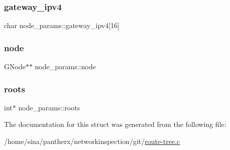 \subsubsection{\texorpdfstring{gateway\+\_\+ipv4}{gateway\_ipv4}}
{\footnotesize\ttfamily char node\+\_\+params\+::gateway\+\_\+ipv4\mbox{[}16\mbox{]}}

\mbox{\label{structnode__params_a86b07f6f7d575e6b84723fbe1540771f}} 
\subsubsection{\texorpdfstring{node}{node}}
{\footnotesize\ttfamily G\+Node$\ast$$\ast$ node\+\_\+params\+::node}

\mbox{\label{structnode__params_a5a78aaca912a055ee5920a7b222b0fd1}} 
\subsubsection{\texorpdfstring{roots}{roots}}
{\footnotesize\ttfamily int$\ast$ node\+\_\+params\+::roots}



The documentation for this struct was generated from the following file\+:\begin{DoxyCompactItemize}
\item 
/home/sina/pantherx/networkinspection/git/\hyperlink{route-tree_8c}{route-\/tree.\+c}\end{DoxyCompactItemize}
